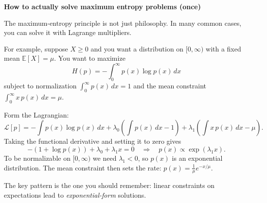 \begin{examplebox}
\textbf{How to actually solve maximum entropy problems (once)}

\vspace{0.5em}

The maximum-entropy principle is not just philosophy. In many common cases, you can solve it with Lagrange multipliers.

\vspace{0.5em}

For example, suppose $X\ge 0$ and you want a distribution on $[0,\infty)$ with a fixed mean $\mathbb{E}[X]=\mu$. You want to maximize
\begin{equation*}
H(p) = -\int_0^\infty p(x)\log p(x)\,dx
\end{equation*}
subject to normalization $\int_0^\infty p(x)\,dx = 1$ and the mean constraint $\int_0^\infty x\,p(x)\,dx=\mu$.

\vspace{0.5em}

Form the Lagrangian:
\begin{equation*}
\mathcal{L}[p] = -\int p(x)\log p(x)\,dx + \lambda_0\!\left(\int p(x)\,dx - 1\right) + \lambda_1\!\left(\int x\,p(x)\,dx - \mu\right).
\end{equation*}
Taking the functional derivative and setting it to zero gives
\begin{equation*}
-(1+\log p(x)) + \lambda_0 + \lambda_1 x = 0
\quad\Rightarrow\quad
p(x) \propto \exp(\lambda_1 x).
\end{equation*}
To be normalizable on $[0,\infty)$ we need $\lambda_1<0$, so $p(x)$ is an exponential distribution. The mean constraint then sets the rate: $p(x)=\frac{1}{\mu}e^{-x/\mu}$.

\vspace{0.5em}

The key pattern is the one you should remember: linear constraints on expectations lead to \emph{exponential-form} solutions.
\end{examplebox}

\vspace{1.5em}

